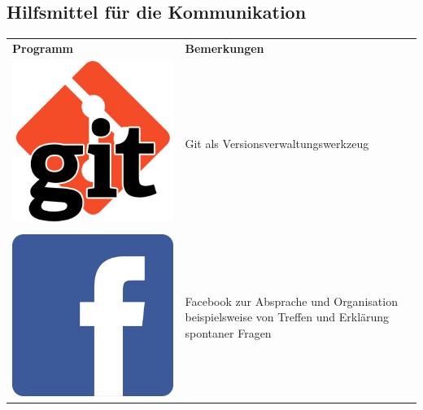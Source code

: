 \documentclass[a4paper, 11pt]{article} %
\begin{document}
\subsection{Hilfsmittel für die Kommunikation}
\begin{tabular}{lp{9cm}}
\textbf{Programm} & \textbf{Bemerkungen} \\ 
\includegraphics[scale=0.22]{images/git.png} & 
\nohyphens{
Git als Versionsverwaltungswerkzeug
} \\\\
\includegraphics[scale=0.099]{images/facebook.png} & 
\nohyphens{
Facebook zur Absprache und Organisation beispielsweise von Treffen und Erklärung spontaner Fragen
} \\
\end{tabular} 
\end{document}
